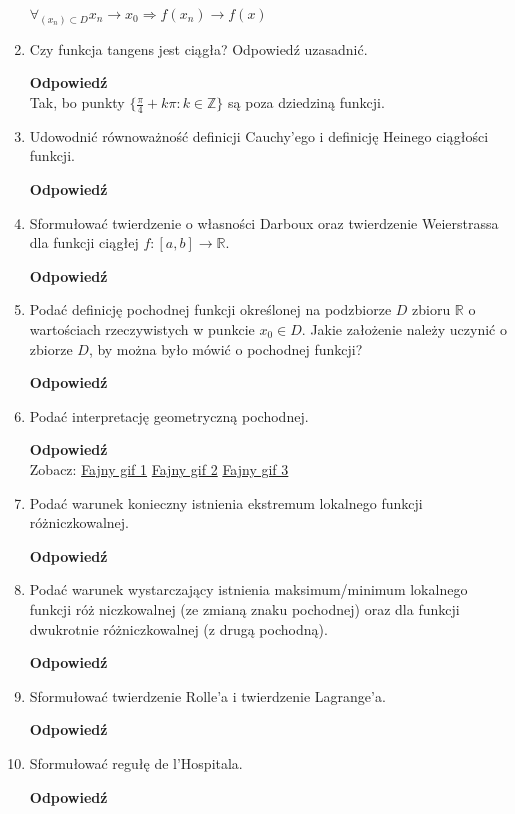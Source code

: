\documentclass[12pt,a4paper]{article}
\newcounter{twierdzenie}
\theoremstyle{break}
\newcommand{\Odp}[1]{
		\begin{mdframed}[style=zadanie]
			\textbf{Odpowiedź}\\
			#1
		\end{mdframed}
	}
\begin{document}
\begin{enumerate}[1.]
{		$\forall_{(x_n)\subset D} x_n\rightarrow x_0 \Rightarrow f(x_n)\rightarrow f(x)$
		
		
	}
	
	\item Czy funkcja tangens jest ciągła? Odpowiedź uzasadnić.
	\Odp{
		Tak, bo punkty $\{\frac{\pi}{4}+k\pi:k\in\mathbb{Z}\}$ są poza dziedziną funkcji.
	}
	
	\item Udowodnić równoważność definicji Cauchy’ego i definicję Heinego ciągłości funkcji.
	\Odp{
		
	}
	
	\item Sformułować twierdzenie o własności Darboux oraz twierdzenie Weierstrassa dla funkcji ciągłej $f : [a, b] \rightarrow \mathbb{R}$.
	\Odp{
	
	}
	
	\item Podać definicję pochodnej funkcji określonej na podzbiorze $D$ zbioru $\mathbb{R}$ o wartościach rzeczywistych w punkcie $x_0 \in D$. Jakie założenie należy uczynić o zbiorze $D$, by można było mówić o pochodnej funkcji?
	\Odp{

	}
	
	\item Podać interpretację geometryczną pochodnej.
	\Odp{
		Zobacz: \href{https://tenor.com/view/limite-math-y-axis-x-axis-calculus-gif-14990687}{Fajny gif 1}\hspace{1cm}
		\href{https://tenor.com/view/derivative-gif-23137892}{Fajny gif 2}\hspace{1cm}
		\href{https://tenor.com/view/derivada-gif-22383091}{Fajny gif 3}
	}
	
	\item Podać warunek konieczny istnienia ekstremum lokalnego funkcji różniczkowalnej.
	\Odp{
		
	}
	
	\item Podać warunek wystarczający istnienia maksimum/minimum lokalnego funkcji róż	niczkowalnej (ze zmianą znaku pochodnej) oraz dla funkcji dwukrotnie różniczkowalnej (z drugą pochodną).
	\Odp{
	
	}
	
	\item Sformułować twierdzenie Rolle’a i twierdzenie Lagrange’a.
	\Odp{
	
	}
	
	\item Sformułować regułę de l’Hospitala.
	\Odp{
	
}
\end{enumerate}
\end{document}
